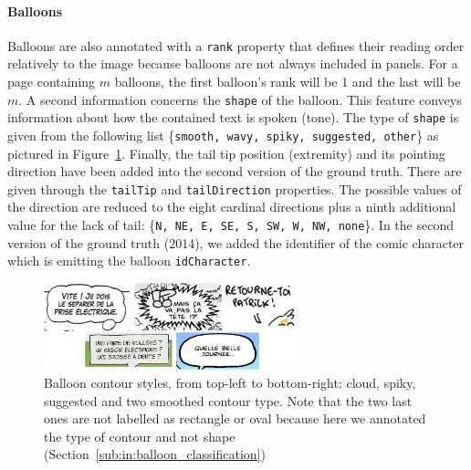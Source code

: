 \paragraph{Balloons}
Balloons are also annotated with a \texttt{{rank}} property that defines their reading order relatively to the image because balloons are not always included in panels.
For a page containing $m$ balloons, the first balloon's rank will be 1 and the last will be $m$.
A second information concerns the \texttt{{shape}} of the balloon.
This feature conveys information about how the contained text is spoken (tone).
The type of \texttt{{shape}} is given from the following list \{\texttt{smooth, wavy, spiky, suggested, other}\} as pictured in Figure~\ref{fig:gt:balloonShape}.
Finally, the tail tip position (extremity) and its pointing direction have been added into the second version of the ground truth.
There are given through the \texttt{{tailTip}} and \texttt{{tailDirection}} properties.
The possible values of the direction are reduced to the eight cardinal directions plus a ninth additional value for the lack of tail: \{\texttt{N, NE, E, SE, S, SW, W, NW, none}\}.
In the second version of the ground truth (2014), we added the identifier of the comic character which is emitting the balloon \texttt{{idCharacter}}. 

\begin{figure}[h!]
\begin{center}
\includegraphics[width=0.65\textwidth]{balloonShape.png}
\caption[Balloon contour styles]{Balloon contour styles, from top-left to bottom-right: cloud, spiky, suggested and two smoothed contour type. Note that the two last ones are not labelled as rectangle or oval because here we annotated the type of contour and not shape (Section~\ref{sub:in:balloon_classification})}
\label{fig:gt:balloonShape}
\end{center}
\end{figure}

